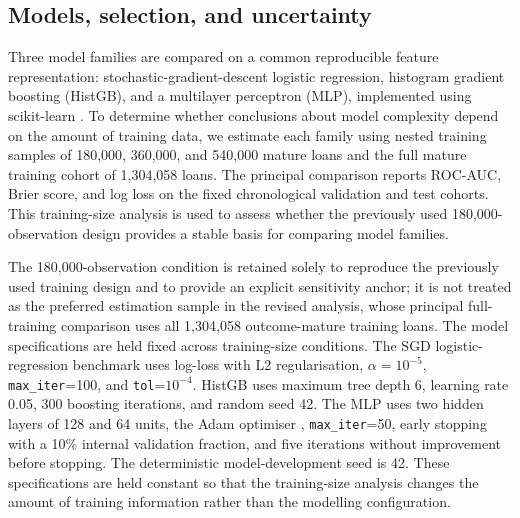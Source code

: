 \documentclass[10pt]{article}
\begin{document}
\subsection{Models, selection, and uncertainty}
\label{sec:models}

Three model families are compared on a common reproducible feature representation: stochastic-gradient-descent logistic regression, histogram gradient boosting (HistGB), and a multilayer perceptron (MLP), implemented using scikit-learn \cite{ref41}. To determine whether conclusions about model complexity depend on the amount of training data, we estimate each family using nested training samples of 180,000, 360,000, and 540,000 mature loans and the full mature training cohort of 1,304,058 loans. The principal comparison reports ROC-AUC, Brier score, and log loss on the fixed chronological validation and test cohorts. This training-size analysis is used to assess whether the previously used 180,000-observation design provides a stable basis for comparing model families.

The 180,000-observation condition is retained solely to reproduce the previously used training design and to provide an explicit sensitivity anchor; it is not treated as the preferred estimation sample in the revised analysis, whose principal full-training comparison uses all 1,304,058 outcome-mature training loans. The model specifications are held fixed across training-size conditions. The SGD logistic-regression benchmark uses log-loss with L2 regularisation, $\alpha=10^{-5}$, \texttt{max\_iter}=100, and \texttt{tol}=$10^{-4}$. HistGB uses maximum tree depth 6, learning rate 0.05, 300 boosting iterations, and random seed 42. The MLP uses two hidden layers of 128 and 64 units, the Adam optimiser \cite{ref42}, \texttt{max\_iter}=50, early stopping with a 10\% internal validation fraction, and five iterations without improvement before stopping. The deterministic model-development seed is 42. These specifications are held constant so that the training-size analysis changes the amount of training information rather than the modelling configuration.
\end{document}
